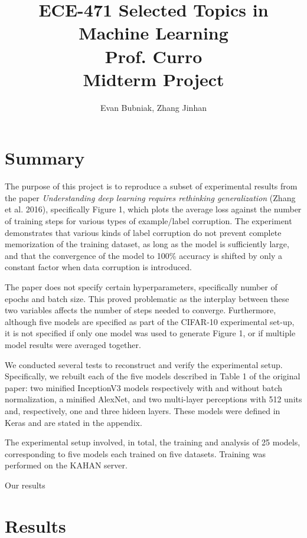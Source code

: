 \documentclass[12pt]{article}
\title{%
	ECE-471 Selected Topics in Machine Learning \\
	Prof. Curro \\
	Midterm Project}
\author{Evan Bubniak, Zhang Jinhan}
\begin{document}
\maketitle

\section{Summary}

The purpose of this project is to reproduce a subset of experimental results from the paper \textit{Understanding deep learning requires rethinking generalization} (Zhang et al. 2016), specifically Figure 1, which plots the average loss against the number of training steps for various types of example/label corruption. The experiment demonstrates that various kinds of label corruption do not prevent complete memorization of the training dataset, as long as the model is sufficiently large, and that the convergence of the model to 100\% accuracy is shifted by only a constant factor when data corruption is introduced.

The paper does not specify certain hyperparameters, specifically number of epochs and batch size. This proved problematic as the interplay between these two variables affects the number of steps needed to converge. Furthermore, although five models are specified as part of the CIFAR-10 experimental set-up, it is not specified if only one model was used to generate Figure 1, or if multiple model results were averaged together.

We conducted several tests to reconstruct and verify the experimental setup. Specifically, we rebuilt each of the five models described in Table 1 of the original paper: two minified InceptionV3 models respectively with and without batch normalization, a minified AlexNet, and two multi-layer perceptions with 512 units and, respectively, one and three hideen layers. These models were defined in Keras and are stated in the appendix.

The experimental setup involved, in total, the training and analysis of 25 models, corresponding to five models each trained on five datasets. Training was performed on the KAHAN server.

Our results 

\section{Results}
\end{document}
